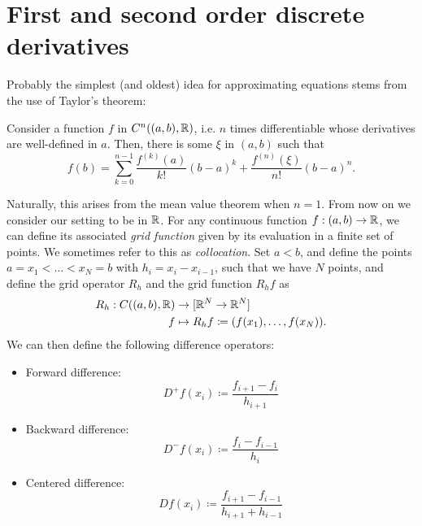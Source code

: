 \section{First and second order discrete derivatives}\label{sec:first-second-fd}
Probably the simplest (and oldest) idea for approximating equations stems from the use of Taylor's theorem:
\begin{theorem}\label{thm:taylor}
    Consider a function $f$ in $C^n((a,b), \mathbb{R})$, i.e. $n$ times differentiable whose derivatives are well-defined in $a$. Then, there is some $\xi$ in $(a,b)$ such that
    \begin{equation}
        f(b) = \sum_{k=0}^{n-1}\frac{f^{(k)}(a)}{k!}(b-a)^k + \frac{f^{(n)}(\xi)}{n!}(b-a)^n.
    \end{equation}
\end{theorem}
Naturally, this arises from the mean value theorem when $n=1$. From now on we consider our setting to be in $\mathbb{R}$. For any continuous function $f:(a,b)\to \mathbb{R}$, we can define its associated \emph{grid function} given by its evaluation in a finite set of points. We sometimes refer to this as \emph{collocation}. Set $a<b$, and define the points $a=x_1<\hdots<x_N=b$ with $h_i=x_{i}-x_{i-1}$, such that we have $N$ points, and define the grid operator $R_h$ and the grid function $R_h f$ as
\begin{equation}\label{eq:def-grid-function}
    \begin{aligned}
        R_h:C((a,b),\mathbb{R})&\to [\mathbb{R}^N\to \mathbb{R}^N]\\
        f &\mapsto R_h f \coloneqq (f(x_1), \dots, f(x_N)).
    \end{aligned}
\end{equation}
We can then define the following difference operators: 
\begin{itemize}
    \item Forward difference: 
    \begin{equation*}
        D^+f(x_i) \coloneqq \frac{f_{i+1} - f_i}{h_{i+1}}
    \end{equation*}
    \item Backward difference: 
    \begin{equation*}
        D^-f(x_i) \coloneqq \frac{f_{i} - f_{i-1}}{h_{i}}
    \end{equation*}
    \item Centered difference:
    \begin{equation*}
        Df(x_i) \coloneqq \frac{f_{i+1} - f_{i-1}}{h_{i+1} + h_{i-1}}
    \end{equation*}
\end{itemize}
